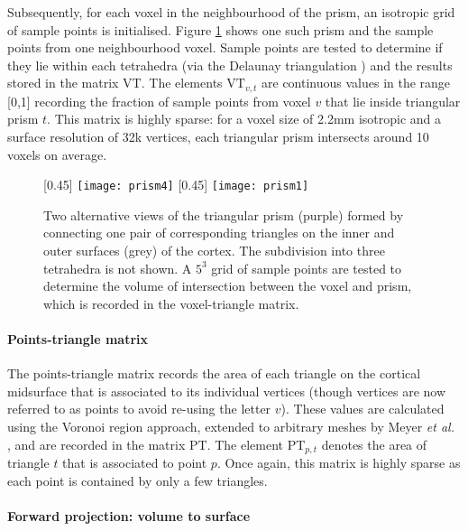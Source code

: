 \documentclass[review]{elsarticle}
\newcommand{\mat}[1]{\mathrm{#1}}
\begin{document}
Subsequently, for each voxel in the neighbourhood of the prism, an isotropic grid of sample points is initialised. Figure \ref{prism} shows one such prism and the sample points from one neighbourhood voxel. Sample points are tested to determine if they lie within each tetrahedra (via the Delaunay triangulation \cite{Barber:1996:QAC:235815.235821}) and the results stored in the matrix $\mat{VT}$. The elements $\mat{VT}_{v,t}$ are continuous values in the range [0,1] recording the fraction of sample points from voxel $v$ that lie inside triangular prism $t$. This matrix is highly sparse: for a voxel size of 2.2mm isotropic and a surface resolution of 32k vertices, each triangular prism intersects around 10 voxels on average.

\begin{figure}[H]
\centering
\subcaptionbox{\label{prism1}}[0.45\textwidth]
{\texttt{[image: prism4]}}
\subcaptionbox{\label{prism2}}[0.45\textwidth]
{\texttt{[image: prism1]}}
\caption{Two alternative views of the triangular prism (purple) formed by connecting one pair of corresponding triangles on the inner and outer surfaces (grey) of the cortex. The subdivision into three tetrahedra is not shown. A $5^3$ grid of sample points are tested to determine the volume of intersection between the voxel and prism, which is recorded in the voxel-triangle matrix.} 
\label{prism}
\end{figure}

\paragraph{Points-triangle matrix}
The points-triangle matrix records the area of each triangle on the cortical midsurface that is associated to its individual vertices (though vertices are now referred to as points to avoid re-using the letter $v$). These values are calculated using the Voronoi region approach, extended to arbitrary meshes by Meyer \textit{et al.} \cite{Meyer2003}, and are recorded in the matrix $\mat{PT}$. The element $\mat{PT}_{p,t}$ denotes the area of triangle $t$ that is associated to point $p$. Once again, this matrix is highly sparse as each point is contained by only a few triangles. 

\paragraph{Forward projection: volume to surface}
\end{document}
